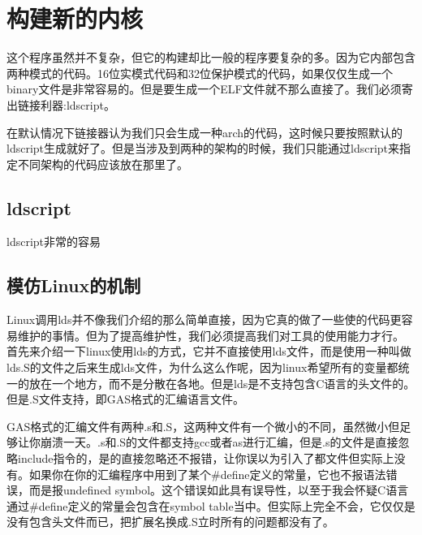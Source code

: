 \section{构建新的内核}
这个程序虽然并不复杂，但它的构建却比一般的程序要复杂的多。因为它内部包含两种模式的代码。16位实模式代码和32位保护模式的代码，如果仅仅生成一个binary文件是非常容易的。但是要生成一个ELF文件就不那么直接了。我们必须寄出链接利器:ldscript。

在默认情况下链接器认为我们只会生成一种arch的代码，这时候只要按照默认的ldscript生成就好了。但是当涉及到两种的架构的时候，我们只能通过ldscript来指定不同架构的代码应该放在那里了。

\subsection{ldscript}
ldscript非常的容易

\subsection{模仿Linux的机制}
Linux调用lds并不像我们介绍的那么简单直接，因为它真的做了一些使的代码更容易维护的事情。但为了提高维护性，我们必须提高我们对工具的使用能力才行。
首先来介绍一下linux使用lds的方式，它并不直接使用lds文件，而是使用一种叫做lds.S的文件之后来生成lds文件，为什么这么作呢，因为linux希望所有的变量都统一的放在一个地方，而不是分散在各地。但是lds是不支持包含C语言的头文件的。但是.S文件支持，即GAS格式的汇编语言文件。

GAS格式的汇编文件有两种.s和.S，这两种文件有一个微小的不同，虽然微小但足够让你崩溃一天。.s和.S的文件都支持gcc或者as进行汇编，但是.s的文件是直接忽略include指令的，是的直接忽略还不报错，让你误以为引入了都文件但实际上没有。如果你在你的汇编程序中用到了某个\#define定义的常量，它也不报语法错误，而是报undefined symbol。这个错误如此具有误导性，以至于我会怀疑C语言通过\#define定义的常量会包含在symbol table当中。但实际上完全不会，它仅仅是没有包含头文件而已，把扩展名换成.S立时所有的问题都没有了。

